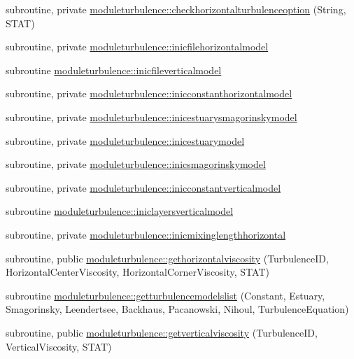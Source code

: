 \begin{DoxyCompactItemize}
\item 
subroutine, private \mbox{\hyperlink{namespacemoduleturbulence_a2df9458a1ab29d4f5f3fd747ded725b4}{moduleturbulence\+::checkhorizontalturbulenceoption}} (String, S\+T\+AT)
\item 
subroutine, private \mbox{\hyperlink{namespacemoduleturbulence_af876648dc22afb9f49305a2d9c2f1be4}{moduleturbulence\+::inicfilehorizontalmodel}}
\item 
subroutine \mbox{\hyperlink{namespacemoduleturbulence_abccdbd06f5d7520144dadb5297887cfb}{moduleturbulence\+::inicfileverticalmodel}}
\item 
subroutine, private \mbox{\hyperlink{namespacemoduleturbulence_a1d7775ffdad42a39e0e66a78b56f8faf}{moduleturbulence\+::inicconstanthorizontalmodel}}
\item 
subroutine, private \mbox{\hyperlink{namespacemoduleturbulence_a7dcc612b541b2355f6ee7df80ef63634}{moduleturbulence\+::inicestuarysmagorinskymodel}}
\item 
subroutine, private \mbox{\hyperlink{namespacemoduleturbulence_ad65bc066b505edcac467325fc067aa87}{moduleturbulence\+::inicestuarymodel}}
\item 
subroutine, private \mbox{\hyperlink{namespacemoduleturbulence_a3ccb54fdbe649b382ed14de6135fd7b9}{moduleturbulence\+::inicsmagorinskymodel}}
\item 
subroutine, private \mbox{\hyperlink{namespacemoduleturbulence_a2cecb8eb2b3e94ef70af30650d368ef8}{moduleturbulence\+::inicconstantverticalmodel}}
\item 
subroutine \mbox{\hyperlink{namespacemoduleturbulence_af52d9bce4123a146f0b750fab46833ee}{moduleturbulence\+::iniclayersverticalmodel}}
\item 
subroutine, private \mbox{\hyperlink{namespacemoduleturbulence_af1c597f7f366a455e6e36dbc70ea56b6}{moduleturbulence\+::inicmixinglengthhorizontal}}
\item 
subroutine, public \mbox{\hyperlink{namespacemoduleturbulence_a37e3796794d913feea94c19ec07b14fb}{moduleturbulence\+::gethorizontalviscosity}} (Turbulence\+ID, Horizontal\+Center\+Viscosity, Horizontal\+Corner\+Viscosity, S\+T\+AT)
\item 
subroutine \mbox{\hyperlink{namespacemoduleturbulence_a7e2b5e220e823c62e0ceb84ca26e734b}{moduleturbulence\+::getturbulencemodelslist}} (Constant, Estuary, Smagorinsky, Leendertsee, Backhaus, Pacanowski, Nihoul, Turbulence\+Equation)
\item 
subroutine, public \mbox{\hyperlink{namespacemoduleturbulence_a2ef11327f7c8ee6d8580c79c1a68bbdc}{moduleturbulence\+::getverticalviscosity}} (Turbulence\+ID, Vertical\+Viscosity, S\+T\+AT)

\end{DoxyCompactItemize}
